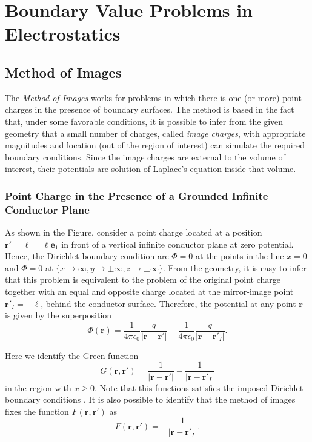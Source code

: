 \chapter{Boundary Value Problems in Electrostatics} 

\section{ Method of Images}

The \textit{Method of Images} works for problems in which there is one (or more) point charges in the presence of boundary surfaces. The method is based in the fact that, under some favorable conditions, it is possible to infer from the given geometry that a small number of charges, called \textit{image charges}, with appropriate magnitudes and location (out of the region of interest) can simulate the required boundary conditions. Since the image charges are external to the volume of interest, their potentials are solution of Laplace's equation inside that volume.

\subsection{ Point Charge in the Presence of a Grounded Infinite Conductor Plane}
As shown in the Figure, consider a point charge located at a position $\textbf{r}' = \boldsymbol{\ell} = \ell \textbf{e}_1$ in front of a vertical infinite conductor plane at zero potential. Hence, the Dirichlet boundary condition are $\Phi=0$ at the points in the line $x=0$ and $\Phi=0$ at $\{ x\rightarrow \infty, y\rightarrow \pm \infty ,z \rightarrow \pm \infty \} $. From the geometry, it is easy to infer that this problem is equivalent to the problem of the original point charge together with an equal and opposite  charge  located at the mirror-image point $\textbf{r}'_I = -\boldsymbol{\ell}$, behind the conductor surface. Therefore, the potential at any point $\textbf{r}$ is given by the superposition
\begin{equation}
\Phi (\textbf{r}) = \frac{1}{4\pi \epsilon_0} \frac{q}{\left| \textbf{r} - \textbf{r}' \right|} - \frac{1}{4\pi \epsilon_0} \frac{q}{\left| \textbf{r} - \textbf{r}'_I \right|}.
\end{equation}

Here we identify the Green function
\begin{equation}
G(\textbf{r}, \textbf{r}') = \frac{1}{\left| \textbf{r} - \textbf{r}' \right|} -  \frac{1}{\left| \textbf{r} - \textbf{r}'_I \right|}
\end{equation}
in the region with $x\geq 0$. Note that this functions satisfies the imposed Dirichlet boundary conditions . It is also possible to identify that the method of images fixes the function $F(\textbf{r}, \textbf{r}')$ as
\begin{equation}
F(\textbf{r}, \textbf{r}') = -  \frac{1}{\left| \textbf{r} - \textbf{r}'_I \right|}.
\end{equation}


